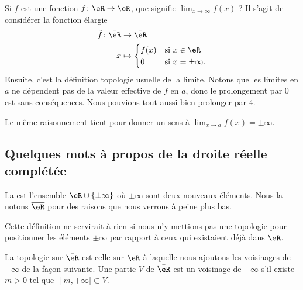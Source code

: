 Si \( f\) est une fonction \( f\colon \eR\to \eR\), que signifie \( \lim_{x\to \infty} f(x)\) ? Il s'agit de considérer la fonction élargie
\begin{equation}
    \begin{aligned}
        \tilde f\colon \bar \eR&\to \bar\eR \\
        x&\mapsto \begin{cases}
            f(x)    &   \text{si } x\in \eR\\
            0    &    \text{si } x=\pm\infty.
        \end{cases}
    \end{aligned}
\end{equation}
Ensuite, c'est la définition topologie usuelle de la limite. Notons que les limites en \( a\) ne dépendent pas de la valeur effective de \( f\) en \( a\), donc le prolongement par \( 0\) est sans conséquences. Nous pouvions tout aussi bien prolonger par \( 4\).

Le même raisonnement tient pour donner un sens à \( \lim_{x\to a} f(x)=\pm \infty\).

\subsection{Quelques mots à propos de la droite réelle complétée} 

\begin{definition}
    La  est l'ensemble \( \eR\cup\{ \pm \infty \}\) où \( \pm\infty\) sont deux nouveaux éléments. Nous la notons \( \overline{ \eR }\) pour des raisons que nous verrons à peine plus bas.
\end{definition}

Cette définition ne servirait à rien si nous n'y mettions pas une topologie pour positionner les éléments \( \pm\infty\) par rapport à ceux qui existaient déjà dans \( \eR\).

\begin{definition}
La topologie sur \(\bar \eR\) est celle sur \( \eR\) à laquelle nous ajoutons les voisinages de \( \pm\infty\) de la façon suivante. Une partie \( V\) de \( \bar \eR\) est un voisinage de \( +\infty\) s'il existe \( m>0\) tel que \( \mathopen] m , +\infty \mathclose]\subset V\).
\end{definition}

